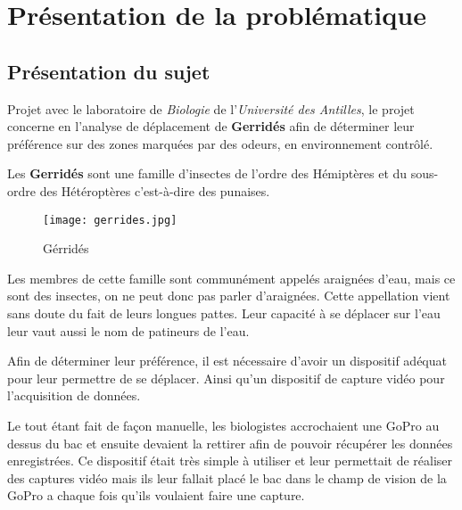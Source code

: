 \chapter{Présentation de la problématique}
    \section{Présentation du sujet}
    Projet avec le laboratoire de \textit{Biologie} de l'\textit{Université des Antilles}, le projet concerne en l'analyse de déplacement de \textbf{Gerridés} afin de déterminer leur préférence sur des zones marquées par des odeurs, en environnement contrôlé.

    \vspace{0.5cm}

    Les \textbf{Gerridés} sont une famille d'insectes de l'ordre des Hémiptères et du sous-ordre des Hétéroptères c'est-à-dire des punaises.
    \begin{figure}[h]
        \centering
        \texttt{[image: gerrides.jpg]}
        \caption{Gérridés}        
    \end{figure}

    \vspace{0.1cm}

    \begin{flushleft}
        Les membres de cette famille sont communément appelés araignées d’eau, mais ce sont des insectes, on ne peut donc pas parler d'araignées. Cette appellation vient sans doute du fait de leurs longues pattes. Leur capacité à se déplacer sur l'eau leur vaut aussi le nom de patineurs de l'eau.        
    \end{flushleft}

    \vspace{0.5cm}

    Afin de déterminer leur préférence, il est nécessaire d'avoir un dispositif adéquat pour leur permettre de se déplacer.
    Ainsi qu'un dispositif de capture vidéo pour l'acquisition de données.

    \vspace{0.1cm}

    \begin{flushleft}
        Le tout étant fait de façon manuelle, les biologistes accrochaient une GoPro au dessus du bac et ensuite devaient la rettirer afin de pouvoir récupérer les données enregistrées. Ce dispositif était très simple à utiliser et leur permettait de réaliser des captures vidéo mais ils leur fallait placé le bac dans le champ de vision de la GoPro a chaque fois qu'ils voulaient faire une capture.        
    \end{flushleft}

